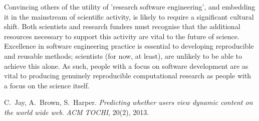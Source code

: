 \documentclass[a4paper,USenglish]{dagrep}
\begin{document}
Convincing others of the utility of 'research software engineering', and embedding it 
in the mainstream of scientific activity, is likely to require a significant cultural shift. 
Both scientists and research funders must recognise that the additional resources 
necessary to support this activity are vital to the future of science. Excellence in 
software engineering practice is essential to developing reproducible and reusable 
methods; scientists (for now, at least), are unlikely to be able to achieve this alone. As 
such, people with a focus on software development are as vital to producing genuinely 
reproducible computational research as people with a focus on the science itself. 

\begin{thebibliography}{0}
 C.~Jay, A.~Brown, S.~Harper.
\textsl{Predicting whether users view dynamic content on the world wide web}.
{\em ACM TOCHI}, 20(2), 2013.
\end{thebibliography}
 
\end{document}
